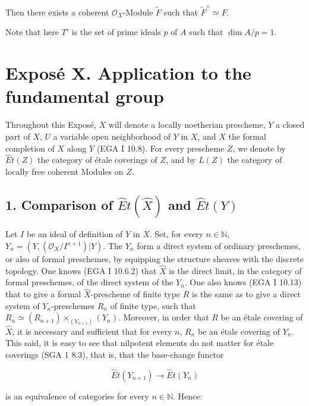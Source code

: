 \documentclass[
]{article}
\begin{document}
Then there exists a coherent \(\mathcal{O}_{X}\)-Module \(\tilde{F}\)
such that \(\tilde{F}^{\wedge} \simeq F\).

Note that here \(T'\) is the set of prime ideals \(p\) of \(A\) such
that \(\dim A/p = 1\).

\section{Exposé X. Application to the fundamental
group}\label{exposuxe9-x.-application-to-the-fundamental-group}

Throughout this Exposé, \(X\) will denote a locally noetherian
prescheme, \(Y\) a closed part of \(X\), \(U\) a variable open
neighborhood of \(Y\) in \(X\), and \(\hat{X}\) the formal completion of
\(X\) along \(Y\) (EGA I 10.8). For every prescheme \(Z\), we denote by
\(\hat{E}t(Z)\) the category of étale coverings of \(Z\), and by
\(L(Z)\) the category of locally free coherent Modules on \(Z\).

\subsection{\texorpdfstring{1. Comparison of \(\hat{E}t(\hat{X})\) and
\(\hat{E}t(Y)\)}{1. Comparison of \textbackslash hat\{E\}t(\textbackslash hat\{X\}) and \textbackslash hat\{E\}t(Y)}}\label{comparison-of-hatethatx-and-hatety}

Let \(I\) be an ideal of definition of \(Y\) in \(X\). Set, for every
\(n \in \mathbb{N}\), \(Y_{n} = (Y, (\mathcal{O}_{X}/I^{n+1})|Y)\). The
\(Y_{n}\) form a direct system of ordinary preschemes, or also of formal
preschemes, by equipping the structure sheaves with the discrete
topology. One knows (EGA I 10.6.2) that \(\hat{X}\) is the direct limit,
in the category of formal preschemes, of the direct system of the
\(Y_{n}\). One also knows (EGA I 10.13) that to give a formal
\(\hat{X}\)-prescheme of finite type \(R\) is the same as to give a
direct system of \(Y_{n}\)-preschemes \(R_{n}\) of finite type, such
that \(R_{n} \simeq (R_{n+1}) \times_{(Y_{n+1})} (Y_{n})\). Moreover, in
order that \(R\) be an étale covering of \(\hat{X}\), it is necessary
and sufficient that for every \(n\), \(R_{n}\) be an étale covering of
\(Y_{n}\). This said, it is easy to see that nilpotent elements do not
matter for étale coverings (SGA 1 8.3), that is, that the base-change
functor

\[
\hat{E}t(Y_{n+1}) \longrightarrow \hat{E}t(Y_{n})
\]

is an equivalence of categories for every \(n \in \mathbb{N}\). Hence:
\end{document}
